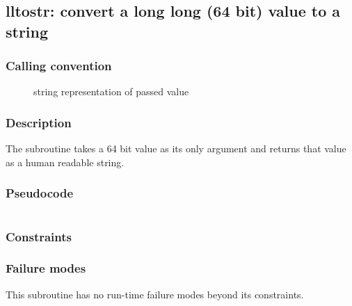 \clearpage
{}
{}
\label{subr:lltostr}
\subsection*{lltostr: convert a long long (64 bit) value to a string}

\subsubsection*{Calling convention}

\begin{description}
\item[] string representation of passed value
\end{description}

\subsubsection*{Description}

The  subroutine takes a 64 bit value as its only
argument and returns that value as a human readable string.

\subsubsection*{Pseudocode}

\begin{verbatim}
\end{verbatim}

\subsubsection*{Constraints}

\subsubsection*{Failure modes}

This subroutine has no run-time failure modes beyond its constraints.
